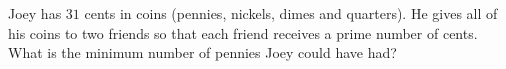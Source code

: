 Joey has $31$ cents in coins (pennies, nickels, dimes and quarters). He gives all of his coins to two friends so that each friend receives a prime number of cents. What is the minimum number of pennies Joey could have had?
